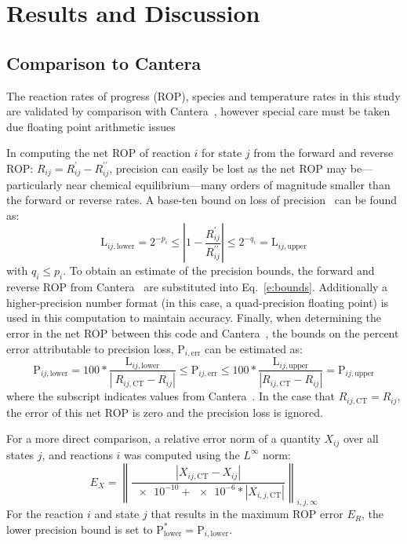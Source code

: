 \documentclass[12pt]{ussci}
\begin{document}
\section{Results and Discussion}
\subsection{Comparison to Cantera}
The reaction rates of progress (ROP), species and temperature rates in this study are validated by comparison with Cantera~\cite{Cantera}, however special care must be taken due floating point arithmetic issues

In computing the net ROP of reaction $i$ for state $j$ from the forward and reverse ROP: $R_{ij} = R_{ij}^{\prime} - R_{ij}^{\prime\prime}$, precision can easily be lost as the net ROP may be---particularly near chemical equilibrium---many orders of magnitude smaller than the forward or reverse rates.
A base-ten bound on loss of precision~\cite{goldberg1991every} can be found as:
\begin{equation}
\text{L}_{ij,\text{lower}} = 2^{-p_i} \le \left\lvert 1 - \frac{R_{ij}^{\prime}}{R_{ij}^{\prime\prime}} \right\rvert \le 2^{-q_i} = \text{L}_{ij,\text{upper}}
\label{e:bounds}
\end{equation}
with $q_i \le p_i$.
To obtain an estimate of the precision bounds, the forward and reverse ROP from Cantera~\cite{Cantera} are substituted into Eq.~\eqref{e:bounds}.
Additionally a higher-precision number format (in this case, a quad-precision floating point) is used in this computation to maintain accuracy.
Finally, when determining the error in the net ROP between this code and Cantera~\cite{Cantera}, the bounds on the percent error attributable to precision loss, $\text{P}_{i,\text{err}}$ can be estimated as:
\begin{equation}
\text{P}_{ij,\text{lower}} = 100 * \frac{\text{L}_{ij,\text{lower}}}{\left\lvert\ R_{ij,\text{CT}} - R_{ij}\right\rvert} \le
\text{P}_{ij,\text{err}} \le 100 * \frac{\text{L}_{ij,\text{upper}}}{\left\lvert R_{ij,\text{CT}} - R_{ij} \right\rvert} = \text{P}_{ij,\text{upper}}
\label{e:rel_bound}
\end{equation}
where the  subscript indicates values from Cantera~\cite{Cantera}.
In the case that $R_{ij,\text{CT}} = R_{ij}$, the error of this net ROP is zero and the precision loss is ignored.

For a more direct comparison, a relative error norm of a quantity $X_{ij}$ over all states $j$, and reactions $i$ was computed using the $L^{\infty}$ norm:
\begin{equation}
 E_{X} = \left\lVert \frac{\left\lvert X_{ij,\text{CT}} - X_{ij}\right\rvert}{\num{e-10} + \num{e-6} * \left\lvert X_{i,j,\text{CT}} \right\rvert} \right\rVert_{i,j,\infty}
\label{e:rel_err}
\end{equation}
For the reaction $i$ and state $j$ that results in the maximum ROP error $E_{R}$, the lower precision bound is set to $\text{P}_{\text{lower}}^{*} = \text{P}_{i,\text{lower}}$.
\end{document}
